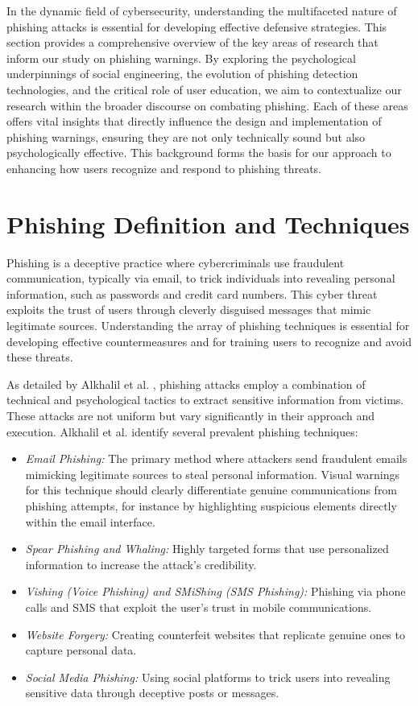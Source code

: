 \documentclass[
  a4paper,  %
  twoside,  %
  bibliography=totoc,
  headsepline,
  cleardoublepage=empty,
  parskip=half,
  draft=false
]{scrbook}
\begin{document}
In the dynamic field of cybersecurity, understanding the multifaceted nature of phishing attacks is essential for developing effective defensive strategies. This section provides a comprehensive overview of the key areas of research that inform our study on phishing warnings. By exploring the psychological underpinnings of social engineering, the evolution of phishing detection technologies, and the critical role of user education, we aim to contextualize our research within the broader discourse on combating phishing. Each of these areas offers vital insights that directly influence the design and implementation of phishing warnings, ensuring they are not only technically sound but also psychologically effective. This background forms the basis for our approach to enhancing how users recognize and respond to phishing threats.

\section{Phishing Definition and Techniques}
Phishing is a deceptive practice where cybercriminals use fraudulent communication, typically via email, to trick individuals into revealing personal information, such as passwords and credit card numbers. This cyber threat exploits the trust of users through cleverly disguised messages that mimic legitimate sources. Understanding the array of phishing techniques is essential for developing effective countermeasures and for training users to recognize and avoid these threats.

As detailed by Alkhalil et al. \cite{alkhalil}, phishing attacks employ a combination of technical and psychological tactics to extract sensitive information from victims. These attacks are not uniform but vary significantly in their approach and execution.
Alkhalil et al. identify several prevalent phishing techniques:
\begin{itemize}
    \item \textit{Email Phishing:} The primary method where attackers send fraudulent emails mimicking legitimate sources to steal personal information. Visual warnings for this technique should clearly differentiate genuine communications from phishing attempts, for instance by highlighting suspicious elements directly within the email interface.
    \item \textit{Spear Phishing and Whaling:} Highly targeted forms that use personalized information to increase the attack's credibility.
    \item \textit{Vishing (Voice Phishing) and SMiShing (SMS Phishing):} Phishing via phone calls and SMS that exploit the user's trust in mobile communications.
    \item \textit{Website Forgery:} Creating counterfeit websites that replicate genuine ones to capture personal data.
    \item \textit{Social Media Phishing:} Using social platforms to trick users into revealing sensitive data through deceptive posts or messages.
\end{itemize}
\end{document}

